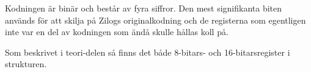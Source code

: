 \documentclass[main.tex]{subfiles}
\begin{document}
Kodningen är binär och består av fyra siffror. Den mest signifikanta biten
används för att skilja på Zilogs originalkodning och de registerna som
egentligen inte var en del av kodningen som ändå skulle hållas koll på.

Som beskrivet i teori-delen så finns det både 8-bitars- och 16-bitarsregister i
strukturen.
\end{document}
